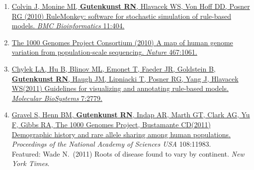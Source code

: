 \documentclass[11pt]{article}
\newcommand{\dadi}{dadi\xspace}
\begin{document}
\begin{enumerate}
\item
\href{http://doi.org/10.1186/1471-2105-11-404}{Colvin J, Monine MI, \textbf{Gutenkunst RN}, Hlavacek WS, {Von Hoff} DD, Posner RG\corresponding
  (2010) {RuleMonkey: software for stochastic simulation of rule-based models.}
\newblock \emph{BMC Bioinformatics} 11:404.}

\item
\href{http://doi.org/10.1038/nature09534}{{The 1000 Genomes Project Consortium} (2010) {A map of human genome variation
  from population-scale sequencing}.
\newblock \emph{Nature} 467:1061.}


\item
\href{http://doi.org/10.1039/C1MB05077J}{Chylek LA, Hu B, Blinov ML, Emonet T, Faeder JR, Goldstein B, \textbf{Gutenkunst RN},
  Haugh JM, Lipniacki T, Posner RG, Yang J, Hlavacek WS\corresponding (2011) {Guidelines for
  visualizing and annotating rule-based models}.
\newblock \emph{Molecular BioSystems} 7:2779.}

\item
\href{http://doi.org/10.1073/pnas.1019276108}{Gravel S, Henn BM, \textbf{Gutenkunst RN}, Indap AR, Marth GT, Clark AG, Yu F, Gibbs RA,
  {The 1000 Genomes Project}, Bustamante CD\corresponding (2011) {Demographic history and
  rare allele sharing among human populations}.}
\newblock \emph{Proceedings of the National Academy of Sciences USA} 108:11983.\\
 Featured: Wade N.\ (2011) Roots of disease found to vary by continent. \emph{New York Times}.


\end{enumerate}
\end{document}
